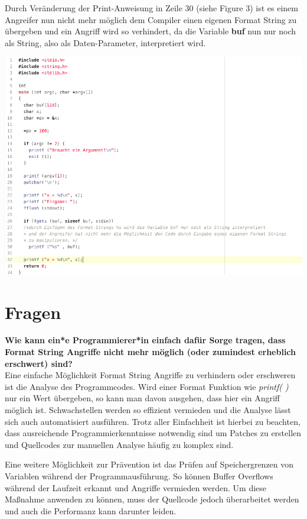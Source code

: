 \documentclass[12pt,a4paper]{article}
\begin{document}
	Durch Veränderung der Print-Anweisung in Zeile 30 (siehe Figure 3) ist es einem Angreifer nun nicht mehr möglich dem Compiler einen eigenen Format String zu übergeben und ein Angriff wird so verhindert, da die Variable \textbf{buf} nun nur noch als String, also als Daten-Parameter, interpretiert wird.

\begin{center}
	\includegraphics[scale=0.3]{betterCode.png}
\end{center}
	
	\section*{Fragen}
	\textbf{Wie kann ein*e Programmierer*in einfach dafür Sorge tragen, dass Format String Angriffe nicht mehr möglich (oder zumindest erheblich erschwert) sind?} \\
	Eine einfache Möglichkeit Format String Angriffe zu verhindern oder erschweren ist die Analyse des Programmcodes. Wird einer Format Funktion wie \textit{printf( )} nur ein Wert übergeben, so kann man davon ausgehen, dass hier ein Angriff möglich ist. Schwachstellen werden so effizient vermieden und die Analyse lässt sich auch automatisiert ausführen. Trotz aller Einfachheit ist hierbei zu beachten, dass ausreichende Programmierkenntnisse notwendig sind um Patches zu erstellen und Quellcodes zur manuellen Analyse häufig zu komplex sind. 
	\bigskip

	Eine weitere Möglichkeit zur Prävention ist das Prüfen auf Speichergrenzen von Variablen während der Programmausführung. So können Buffer Overflows während der Laufzeit erkannt und Angriffe vermieden werden. Um diese Maßnahme anwenden zu können, muss der Quellcode jedoch überarbeitet werden und auch die Performanz kann darunter leiden.
	\bigskip
	
\end{document}
